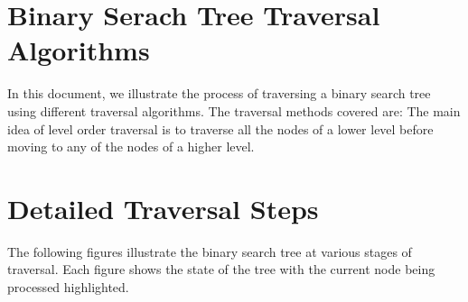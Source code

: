 \documentclass[10pt,a4paper]{article}
\begin{document}
\section*{Binary Serach Tree Traversal Algorithms}
In this document, we illustrate the process of traversing a binary search tree using different traversal algorithms. The traversal methods covered are:
The main idea of level order traversal is to traverse all the nodes of a lower level before moving to any of the nodes of a higher level.

\section*{Detailed Traversal Steps}
The following figures illustrate the binary search tree at various stages of traversal. Each figure shows the state of the tree with the current node being processed highlighted.
\end{document}
